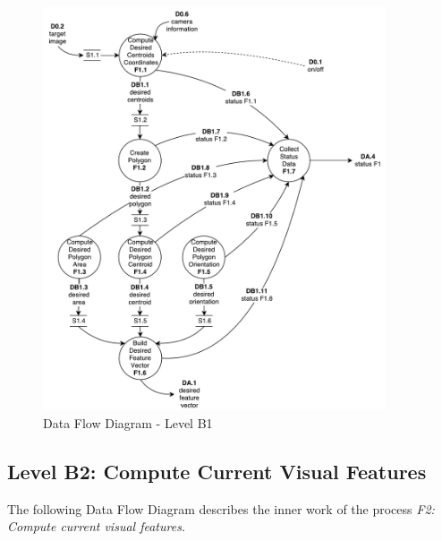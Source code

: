\begin{figure}[!htb]
	\centering
	\includegraphics[width=0.9\textwidth]{content/chapter_03/images/sa_diagram_03.pdf}
	\caption{Data Flow Diagram - Level B1}
	\label{fig:sa_diag_03}
\end{figure}

\pagebreak

\subsection{Level B2: Compute Current Visual Features}
\label{sec:level-B2}

The following Data Flow Diagram describes the inner work of the process \textit{F2: Compute current visual features}.

